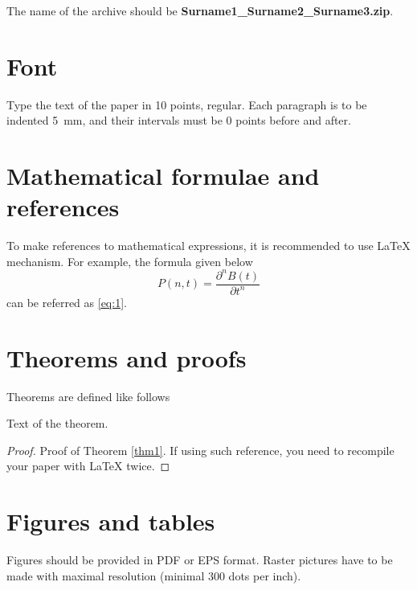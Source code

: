 \documentclass[10pt]{article}
\begin{document}
The name of the archive should be
\textbf{Surname1\_Surname2\_Surname3.zip}.

\section{Font}

Type the text of the paper in 10 points, regular. Each
paragraph is to be indented 5~mm, and their intervals must be 0
points before and after.

\section{Mathematical formulae and references}

To make references to mathematical expressions, it is
recommended to use \LaTeX{} mechanism. For example, the formula
given below
\begin{equation}
\label{eq:1}
P(n,t)=\frac{\partial^n B(t)}{\partial t^n}
\end{equation}
can be referred as \eqref{eq:1}.

\section{Theorems and proofs}

Theorems are defined like follows
\begin{thm}\label{thm1}
Text of the theorem.
\end{thm}

\begin{proof}
Proof of Theorem \ref{thm1}. If using such reference, you need
to recompile your paper with \LaTeX{} twice.
\end{proof}


\section{Figures and tables}

Figures should be provided in PDF or EPS format. Raster pictures have
to be made with maximal resolution (minimal 300 dots per inch).
\end{document}
